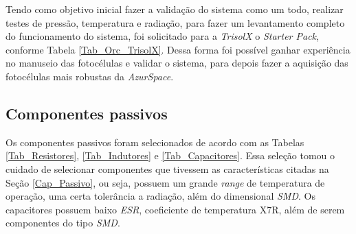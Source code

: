 \documentclass[
	12pt,				%
	openright,			%
	oneside,			%
	a4paper,			%
	english,			%
	french,				%
	spanish,			%
	brazil,				%
	oldfontcommands
	]{abntex2}
\begin{document}
	Tendo como objetivo inicial fazer a validação do sistema como um todo, realizar testes de pressão, temperatura e radiação, para fazer um levantamento completo do funcionamento do sistema, foi solicitado para a \textit{TrisolX} o \textit{Starter Pack}, conforme Tabela \ref{Tab_Orc_TrisolX}. Dessa forma foi possível ganhar experiência no manuseio das fotocélulas e validar o sistema, para depois fazer a aquisição das fotocélulas mais robustas da \textit{AzurSpace}.
	
\subsection[Componentes passivos]{Componentes passivos}
	
	Os componentes passivos foram selecionados de acordo com as Tabelas \ref{Tab_Resistores}, \ref{Tab_Indutores} e \ref{Tab_Capacitores}. Essa seleção tomou o cuidado de selecionar componentes que tivessem as características citadas na Seção \ref{Cap_Passivo}, ou seja, possuem um grande \textit{range} de temperatura de operação, uma certa tolerância a radiação, além do dimensional \textit{SMD}. Os capacitores possuem baixo \textit{ESR}, coeficiente de temperatura X7R, além de serem componentes do tipo \textit{SMD}.
	
\end{document}
